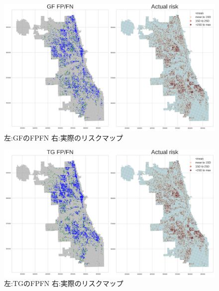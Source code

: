 \begin{figure}
  \centering %
  \includegraphics[scale=0.25]{./add-crime-timeseries-fig/GF_fnp.png}
  \caption{左:GFのFPFN 右:実際のリスクマップ}
  \label{fig:add-crime-timeseries-gf-fnp}
\end{figure}

\begin{figure}
  \centering %
  \includegraphics[scale=0.25]{./add-crime-timeseries-fig/TG_fnp.png}
  \caption{左:TGのFPFN 右:実際のリスクマップ}
  \label{fig:add-crime-timeseries-tg-fnp}
\end{figure}

